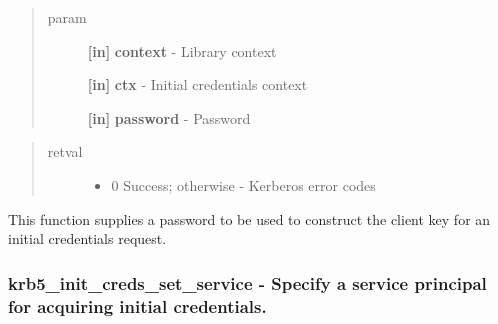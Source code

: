 \documentclass[letterpaper,10pt,english]{sphinxmanual}
\begin{document}
\begin{quote}\begin{description}
\item[{param}] \leavevmode
\textbf{{[}in{]}} \textbf{context} - Library context

\textbf{{[}in{]}} \textbf{ctx} - Initial credentials context

\textbf{{[}in{]}} \textbf{password} - Password

\end{description}\end{quote}
\begin{quote}\begin{description}
\item[{retval}] \leavevmode\begin{itemize}
\item {} 
0   Success; otherwise - Kerberos error codes

\end{itemize}

\end{description}\end{quote}

This function supplies a password to be used to construct the client key for an initial credentials request.


\subsubsection{krb5\_init\_creds\_set\_service -  Specify a service principal for acquiring initial credentials.}
\label{appdev/refs/api/krb5_init_creds_set_service::doc}\label{appdev/refs/api/krb5_init_creds_set_service:krb5-init-creds-set-service-specify-a-service-principal-for-acquiring-initial-credentials}

\begin{fulllineitems}
\label{appdev/refs/api/krb5_init_creds_set_service:c.krb5_init_creds_set_service}
\end{fulllineitems}
\end{document}
